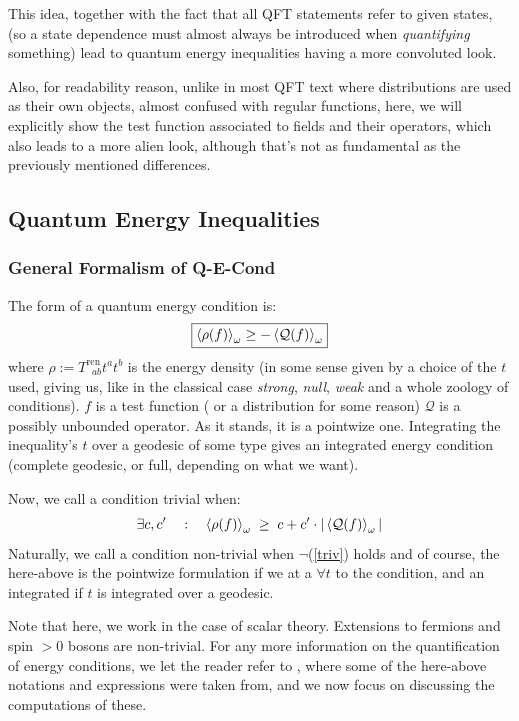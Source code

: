 \documentclass[a4paper,11pt]{article}
\numberwithin{equation}{section}
\theoremstyle{definition}
\begin{document}
This idea, together with the fact that all QFT statements refer to given states, (so a state dependence must almost always be introduced when \emph{quantifying} something) lead to quantum energy inequalities having a more convoluted look.

Also, for readability reason, unlike in most QFT text where distributions are used as their own objects, almost confused with regular functions, here, we will explicitly show the test function associated to fields and their operators, which also leads to a more alien look, although that's not as fundamental as the previously mentioned differences.
\subsection{Quantum Energy Inequalities}
\subsubsection{General Formalism of Q-E-Cond}
The form of a quantum energy condition is:
\begin{equation}
\boxed{\braket{\rho(f)}_\omega \geq - \braket{\mathcal{Q}(f)}_\omega}
\end{equation}
where $\rho:=T^\mathrm{ren}_{\;\;ab}t^at^b$ is the energy density (in some sense given by a choice of the $t$ used, giving us, like in the classical case \emph{strong}, \emph{null}, \emph{weak} and a whole zoology of conditions). $f$ is a test function (\color{red} or a distribution for some reason\color{black}) $\mathcal{Q}$ is a possibly unbounded operator. As it stands, it is a pointwize one. Integrating the inequality's $t$ over a geodesic of some type gives an integrated energy condition (complete geodesic, or full, depending on what we want).

Now, we call a condition trivial when:
\begin{equation} \label{triv}
    \exists c, c' \quad : \quad \braket{\rho(f)}_\omega \; \geq \; c + c'\cdot|\braket{\mathcal{Q}(f)}_\omega|
\end{equation}
Naturally, we call a condition non-trivial when $\lnot$(\ref{triv}) holds and of course, the here-above is the pointwize formulation if we at a $\forall t$ to the condition, and an integrated if $t$ is integrated over a geodesic.

Note that here, we work in the case of scalar theory. Extensions to fermions and spin $>0$ bosons are non-trivial. For any more information on the quantification of energy conditions, we let the reader refer to \cite{EleRev}, where some of the here-above notations and expressions were taken from, and we now focus on discussing the computations of these.
\end{document}
